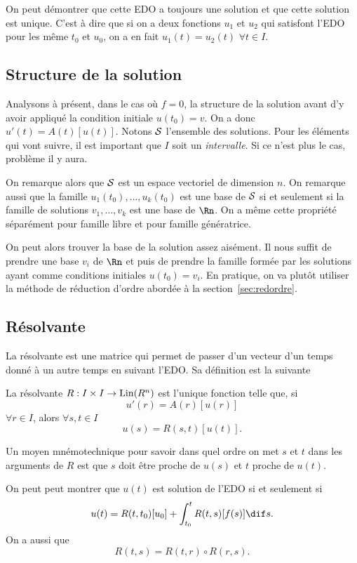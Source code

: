 On peut démontrer que cette EDO a toujours une solution et que cette
solution est unique.
C'est à dire que si on a deux fonctions $u_1$ et $u_2$ qui satisfont
l'EDO pour les même $t_0$ et $u_0$, on a en fait
$u_1(t) = u_2(t)$ $\forall t \in I$.

\subsection{Structure de la solution}
\label{sec:struct}
Analysons à présent, dans le cas où $f = 0$,
la structure de la solution avant d'y avoir appliqué la condition initiale
$u(t_0) = v$.
On a donc $u'(t) = A(t)[u(t)]$.
Notons $\mathcal{S}$ l'ensemble des solutions.
Pour les éléments qui vont suivre,
il est important que $I$ soit un \emph{intervalle}.
Si ce n'est plus le cas, problème il y aura.

On remarque alors que $\mathcal{S}$ est un espace vectoriel
de dimension $n$.
On remarque aussi que
la famille $u_1(t_0), \ldots, u_k(t_0)$ est une base de $\mathcal{S}$
si et seulement si
la famille de solutions $v_1, \ldots, v_k$
est une base de $\Rn$.
On a même cette propriété séparément pour famille libre et pour
famille génératrice.

On peut alors trouver la base de la solution assez aisément.
Il nous suffit de prendre une base $v_i$ de $\Rn$
et puis de prendre la famille
formée par les solutions ayant comme conditions initiales $u(t_0) = v_i$.
En pratique, on va plutôt utiliser la méthode de réduction d'ordre
abordée à la section~\ref{sec:redordre}.

\subsection{Résolvante}
La résolvante est une matrice qui permet de passer d'un vecteur d'un
temps donné à un autre temps en suivant l'EDO.
Sa définition est la suivante

\begin{mydef}[Résolvante]
  La résolvante $R: I \times I \to \operatorname{Lin}(R^n)$ est l'unique fonction
  telle que, si
  \[ u'(r) = A(r)[u(r)] \]
  $\forall r \in I$, alors $\forall s, t \in I$
  \[ u(s) = R(s, t)[u(t)]. \]
\end{mydef}
Un moyen mnémotechnique pour savoir dans quel ordre on met $s$ et $t$ dans
les arguments de $R$ est que $s$ doit être proche de $u(s)$ et $t$ proche
de $u(t)$.

On peut peut montrer que $u(t)$ est solution de l'EDO si et seulement si
\[ u(t) = R(t, t_0)[u_0] + \int_{t_0}^t R(t,s)[f(s)] \dif s. \]
On a aussi que
\[ R(t, s) = R(t, r) \circ R(r, s). \]

